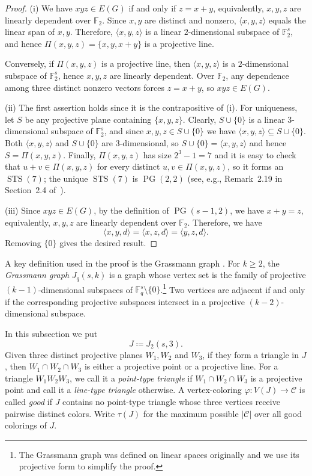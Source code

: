 \documentclass[10pt,a4paper]{article}
\theoremstyle{definition}
\newcommand{\FF}{\mathbb{F}}
\newcommand{\cC}{\mathcal{C}}
\DeclareMathOperator{\STS}{STS}
\DeclareMathOperator{\PG}{PG}
\begin{document}
\begin{proof}
    (i) We have $xyz\in E(G)$ if and only if $z=x+y$, equivalently, $x,y,z$ are linearly dependent over $\FF_2$.
    Since $x,y$ are distinct and nonzero, $\langle x,y,z\rangle$ equals the linear span of $x,y$.
    Therefore, $\langle x,y,z\rangle$ is a linear $2$-dimensional subspace of $\FF_2^s$, and hence $\Pi(x,y,z)=\{x,y,x+y\}$ is a projective line.

    Conversely, if $\Pi(x,y,z)$ is a projective line, then $\langle x,y,z\rangle$ is a $2$-dimensional subspace of $\FF_2^s$, hence $x,y,z$ are linearly dependent.
    Over $\FF_2$, any dependence among three distinct nonzero vectors forces $z=x+y$, so $xyz\in E(G)$.

    (ii)  The first assertion holds since it is the contrapositive of (i).
    For uniqueness, let $S$ be any projective plane containing $\{x,y,z\}$.
    Clearly, $S\cup\{0\}$ is a linear $3$-dimensional subspace of $\FF_2^s$, and since $x,y,z\in S\cup\{0\}$ we have $\langle x,y,z\rangle\subseteq S\cup\{0\}$.
    Both $\langle x,y,z\rangle$ and $S\cup\{0\}$ are $3$-dimensional, so $S\cup\{0\}=\langle x,y,z\rangle$ and hence $S=\Pi(x,y,z)$.
    Finally, $\Pi(x,y,z)$ has size $2^3-1=7$ and it is easy to check that $u+v\in\Pi(x,y,z)$ for every distinct $u,v\in\Pi(x,y,z)$, so it forms an $\STS(7)$; the unique $\STS(7)$ is $\PG(2,2)$ (see, e.g., Remark~2.19 in Section~2.4 of~\cite{handbook}).

    (iii) Since $xyz\in E(G)$, by the definition of $\PG(s-1,2)$, we have $x+y=z$, equivalently, $x,y,z$ are linearly dependent over $\FF_2$.
    Therefore, we have
    \[
        \langle x,y,d \rangle=\langle x,z,d \rangle=\langle y,z,d \rangle.
    \]
    Removing $\{0\}$ gives the desired result.
\end{proof}

\medskip

A key definition used in the proof is the Grassmann graph \cite{chow1949}.
For $k\ge2$, the {\it Grassmann graph} $J_q(s,k)$ is a graph whose vertex set is the family of projective $(k-1)$-dimensional subspaces of $\FF_q^s\setminus\{0\}$.\footnote{The Grassmann graph was defined on linear spaces originally and we use its projective form to simplify the proof.}
Two vertices are adjacent if and only if the corresponding projective subspaces intersect in a projective $(k-2)$-dimensional subspace.

In this subsection we put
\[
    J\coloneqq J_2(s,3).
\]
Given three distinct projective planes $W_1,W_2$ and $W_3$, if they form a triangle in $J$, then $W_1\cap W_2\cap W_3$ is either a projective point or a projective line.
For a triangle $W_1W_2W_3$, we call it a {\it point-type triangle} if $W_1\cap W_2\cap W_3$ is a projective point and call it a {\it line-type triangle} otherwise.
A vertex-coloring $\varphi \colon V(J)\to\cC$ is called {\it good} if $J$ contains no point-type triangle whose three vertices receive pairwise distinct colors.
Write $\tau(J)$ for the maximum possible $|\cC|$ over all good colorings of $J$. %
\end{document}

